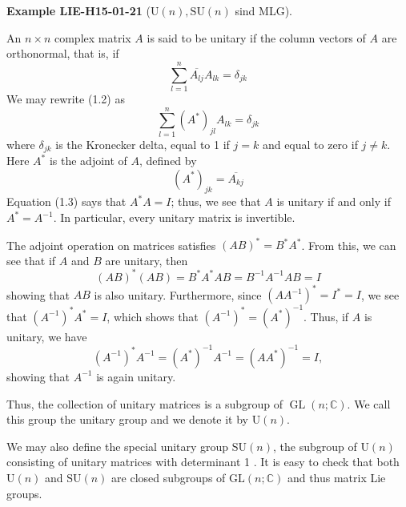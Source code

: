 \documentclass[10pt, letterpaper]{article}
\newcommand{\SU}{\mathrm{SU}}
\newcommand{\U}{\mathrm{U}}
\newcommand{\CustomHeading}[3]{%
  \par\medskip\noindent%
  \textbf{#1 #2} \textnormal{(#3)}.\enskip%
}
\newenvironment{EXA}[2]{\begin{unitbox}\CustomHeading{Example}{#1}{#2}}{\end{unitbox}}
\begin{document}
\begin{EXA}{LIE-H15-01-21}{$\U(n), \SU(n)$ sind MLG}
An $n \times n$ complex matrix $A$ is said to be unitary if the column vectors of $A$ are orthonormal, that is, if
$$
\sum_{l=1}^{n} \overline{A_{l j}} A_{l k}=\delta_{j k}
$$
We may rewrite (1.2) as
$$
\sum_{l=1}^{n}\left(A^{*}\right)_{j l} A_{l k}=\delta_{j k}
$$
where $\delta_{j k}$ is the Kronecker delta, equal to 1 if $j=k$ and equal to zero if $j \neq k$. Here $A^{*}$ is the adjoint of $A$, defined by
$$
\left(A^{*}\right)_{j k}=\overline{A_{k j}}
$$
Equation (1.3) says that $A^{*} A=I$; thus, we see that $A$ is unitary if and only if $A^{*}=A^{-1}$. In particular, every unitary matrix is invertible.

The adjoint operation on matrices satisfies $(A B)^{*}=B^{*} A^{*}$. From this, we can see that if $A$ and $B$ are unitary, then
$$
(A B)^{*}(A B)=B^{*} A^{*} A B=B^{-1} A^{-1} A B=I
$$
showing that $A B$ is also unitary. Furthermore, since $\left(A A^{-1}\right)^{*}=I^{*}=I$, we see that $\left(A^{-1}\right)^{*} A^{*}=I$, which shows that $\left(A^{-1}\right)^{*}=\left(A^{*}\right)^{-1}$. Thus, if $A$ is unitary, we have
$$
\left(A^{-1}\right)^{*} A^{-1}=\left(A^{*}\right)^{-1} A^{-1}=\left(A A^{*}\right)^{-1}=I,
$$
showing that $A^{-1}$ is again unitary.

Thus, the collection of unitary matrices is a subgroup of $\operatorname{GL}(n ; \mathbb{C})$. We call this group the unitary group and we denote it by $\mathrm{U}(n)$. 


We may also define the special unitary group $\mathrm{SU}(n)$, the subgroup of $\mathrm{U}(n)$ consisting of unitary matrices with determinant 1 . It is easy to check that both $\mathrm{U}(n)$ and $\mathrm{SU}(n)$ are closed subgroups of $\mathrm{GL}(n ; \mathbb{C})$ and thus matrix Lie groups.
\end{EXA}
\end{document}
